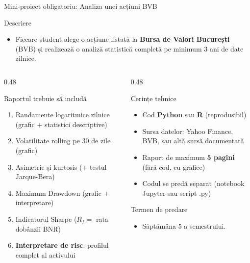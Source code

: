 \documentclass[9pt, aspectratio=169, t]{beamer}
\theoremstyle{definition}
\begin{document}
\begin{frame}[shrink=8]{Mini-proiect obligatoriu: Analiza unei acțiuni BVB}
\begin{block}{Descriere}
\begin{itemize}
\item Fiecare student alege o acțiune listată la \textbf{Bursa de Valori București} (BVB) și realizează o analiză statistică completă pe minimum 3 ani de date zilnice.
\end{itemize}
\end{block}
\vspace{0.1cm}
\begin{columns}[T]
\begin{column}{0.48\textwidth}
\begin{exampleblock}{Raportul trebuie să includă}
\begin{enumerate}
    \item Randamente logaritmice zilnice (grafic + statistici descriptive)
    \item Volatilitate rolling pe 30 de zile (grafic)
    \item Asimetrie și kurtosis (+ testul Jarque-Bera)
    \item Maximum Drawdown (grafic + interpretare)
    \item Indicatorul Sharpe ($R_f = $ rata dobânzii BNR)
    \item \textbf{Interpretare de risc}: profilul complet al activului
\end{enumerate}
\end{exampleblock}
\end{column}
\begin{column}{0.48\textwidth}
\begin{block}{Cerințe tehnice}
\begin{itemize}
    \item Cod \textbf{Python} sau \textbf{R} (reprodusibil)
    \item Sursa datelor: Yahoo Finance, BVB, sau altă sursă documentată
    \item Raport de maximum \textbf{5 pagini} (fără cod, cu grafice)
    \item Codul se predă separat (notebook Jupyter sau script .py)
\end{itemize}
\end{block}
\vspace{0.05cm}
\begin{alertblock}{Termen de predare}
\begin{itemize}\setlength{\itemsep}{0pt}
    \item Săptămâna 5 a semestrului.
\end{itemize}
\end{alertblock}
\end{column}
\end{columns}
\end{frame}
\end{document}
